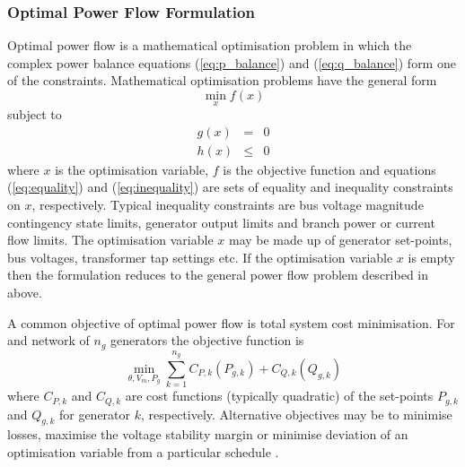 \subsubsection{Optimal Power Flow Formulation}
Optimal power flow is a mathematical optimisation problem in which the complex
power balance equations (\ref{eq:p_balance}) and (\ref{eq:q_balance}) form one
of the constraints. Mathematical optimisation problems have the general form
\begin{equation}
\min_x f(x)
\end{equation}
subject to
\begin{eqnarray}
\label{eq:equality}
g(x)& =& 0\\
\label{eq:inequality}
h(x)& \leq& 0
\end{eqnarray}
where $x$ is the optimisation variable, $f$ is the objective function and
equations (\ref{eq:equality}) and (\ref{eq:inequality}) are sets of equality
and inequality constraints on $x$, respectively.  Typical inequality
constraints are bus voltage magnitude contingency state limits, generator
output limits and branch power or current flow limits.  The optimisation
variable $x$ may be made up of generator set-points, bus voltages, transformer
tap settings etc.  If the optimisation variable $x$ is empty then the
formulation reduces to the general power flow problem described in above.

A common objective of optimal power flow is total system cost minimisation.
For and network of $n_g$ generators the objective function is
\begin{equation}
\label{eq:objfunc}
\min_{\theta, V_m, P_g} \sum_{k=1}^{n_g} C_{P,k}(P_{g,k}) + C_{Q,k}(Q_{g,k})
\end{equation}
where $C_{P,k}$ and $C_{Q,k}$ are cost functions (typically quadratic) of the
set-points $P_{g,k}$ and $Q_{g,k}$ for generator $k$, respectively. Alternative
objectives may be to minimise losses, maximise the voltage stability margin or
minimise deviation of an optimisation variable from a particular schedule
\cite[\S18]{kallrath:2009}.

